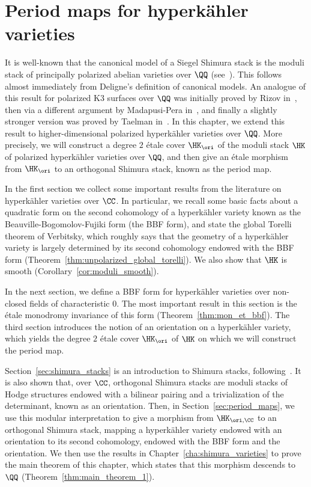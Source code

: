 \chapter{Period maps for hyperk\"ahler varieties}\label{cha:period_map}
It is well-known that the canonical model of a Siegel Shimura stack is the moduli stack of principally polarized abelian varieties over $\QQ$ (see~\cite{DeligneShimura}). This follows almost immediately from Deligne's definition of canonical models. An analogue of this result for polarized K3 surfaces over $\QQ$ was initially proved by Rizov in~\cite{RizovCM}, then via a different argument by Madapusi-Pera in~\cite{MadapusiPera}, and finally a slightly stronger version was proved by Taelman in~\cite{TaelmanShimuraStacks}. In this chapter, we extend this result to higher-dimensional polarized hyperk\"ahler varieties over $\QQ$. More precisely, we will construct a degree $2$ \'etale cover $\HK_{\ori}$ of the moduli stack $\HK$ of polarized hyperk\"ahler varieties over $\QQ$, and then give an \'etale morphism from $\HK_{\ori}$ to an orthogonal Shimura stack, known as the period map.

In the first section we collect some important results from the literature on hyperk\"ahler varieties over $\CC$. In particular, we recall some basic facts about a quadratic form on the second cohomology of a hyperk\"ahler variety known as the Beauville-Bogomolov-Fujiki form (the BBF form), and state the global Torelli theorem of Verbitsky, which roughly says that the geometry of a hyperk\"ahler variety is largely determined by its second cohomology endowed with the BBF form (Theorem~\ref{thm:unpolarized_global_torelli}). We also show that $\HK$ is smooth (Corollary~\ref{cor:moduli_smooth}).

In the next section, we define a BBF form for hyperk\"ahler varieties over non-closed fields of characteristic $0$. The most important result in this section is the \'etale monodromy invariance of this form (Theorem~\ref{thm:mon_et_bbf}). The third section introduces the notion of an orientation on a hyperk\"ahler variety, which yields the degree $2$ \'etale cover $\HK_{\ori}$ of $\HK$ on which we will construct the period map.

Section~\ref{sec:shimura_stacks} is an introduction to Shimura stacks, following~\cite{TaelmanShimuraStacks}. It is also shown that, over $\CC$, orthogonal Shimura stacks are moduli stacks of Hodge structures endowed with a bilinear pairing and a trivialization of the determinant, known as an orientation. Then, in Section~\ref{sec:period_maps}, we use this modular interpretation to give a morphism from $\HK_{\ori,\CC}$ to an orthogonal Shimura stack, mapping a hyperk\"ahler variety endowed with an orientation to its second cohomology, endowed with the BBF form and the orientation. We then use the results in Chapter~\ref{cha:shimura_varieties} to prove the main theorem of this chapter, which states that this morphism descends to $\QQ$ (Theorem~\ref{thm:main_theorem_1}).

